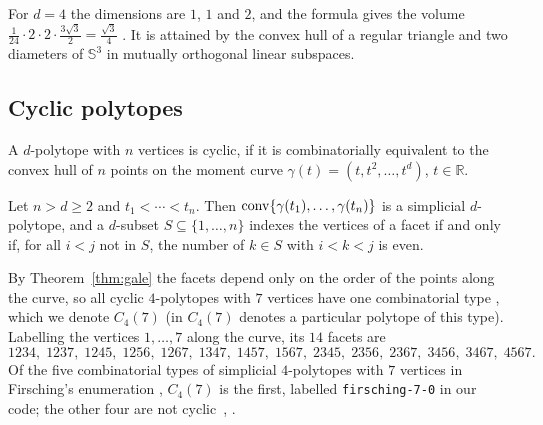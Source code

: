 \begin{remark}
  \label{rem:dim4}
  For $d = 4$ the dimensions are $1$, $1$ and $2$, and the formula gives the
  volume
  ${\frac{1}{24} \cdot 2 \cdot 2 \cdot \frac{3\sqrt{3}}{2} = \frac{\sqrt{3}}{4}}$
  . It is attained by the convex hull of a regular triangle
  and two diameters of $\mathbb{S}^{3}$ in mutually orthogonal linear
  subspaces.
\end{remark}

\subsection{Cyclic polytopes}

\begin{definition}
  A $d$-polytope with $n$ vertices is cyclic, if it is combinatorially
  equivalent to the convex hull of $n$ points on the moment curve
  $\gamma(t) = (t, t^{2}, \ldots, t^{d})$, $t \in \mathbb{R}$.
\end{definition}

\begin{theorem}
  \label{thm:gale}
  Let $n > d \geq 2$ and $t_{1} < \cdots < t_{n}$. Then
  $\operatorname{conv}\{\gamma(t_{1}), \ldots, \gamma(t_{n})\}$ is a simplicial $d$-polytope,
  and a $d$-subset $S \subseteq \{1, \ldots, n\}$ indexes the vertices of a facet
  if and only if, for all $i < j$ not in $S$, the number of $k \in S$ with
  $i < k < j$ is even.
\end{theorem}

\begin{remark}
  \label{rem:cyclic}
  By Theorem~\ref{thm:gale} the facets depend only on the order of the points
  along the curve, so all cyclic $4$-polytopes with $7$ vertices have one
  combinatorial type \cite[Example~0.6]{ziegler-1995}, which we denote
  $C_{4}(7)$ (in \cite{horvath-langi-2016} $C_{4}(7)$ denotes a particular
  polytope of this type).
  Labelling the vertices $1, \ldots, 7$ along the curve, its $14$ facets
  are~
  \[
    1234,\; 1237,\; 1245,\; 1256,\; 1267,\; 1347,\; 1457,\;
    1567,\; 2345,\; 2356,\; 2367,\; 3456,\; 3467,\; 4567.
  \]
  Of the five combinatorial types of simplicial $4$-polytopes with $7$
  vertices in Firsching's enumeration \cite{firsching-2017}, $C_{4}(7)$ is the
  first, labelled \texttt{firsching-7-0} in our code; the other four are not
  cyclic~, .
\end{remark}

